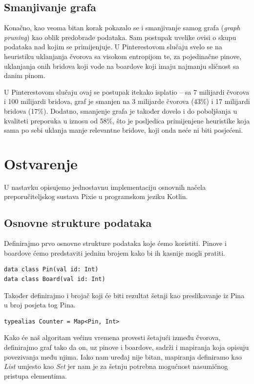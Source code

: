 \documentclass[times, utf8, seminar]{fer}
\begin{document}
\section{Smanjivanje grafa}

Konačno, kao veoma bitan korak pokazalo se i smanjivanje samog grafa (\textit{graph pruning}) kao oblik predobrade podataka. Sam postupak uvelike ovisi o skupu podataka nad kojim se primijenjuje. U Pinterestovom slučaju svelo se na heuristiku uklanjanja čvorova sa visokom entropijom te, za pojedinačne pinove, uklanjanja onih bridova koji vode na boardove koji imaju najmanju sličnost sa danim pinom.

U Pinterestovom slučaju ovaj se postupak itekako isplatio -- sa 7 milijardi čvorova i 100 milijardi bridova, graf je smanjen na 3 milijarde čvorova (43\%) i 17 milijardi bridova (17\%). Dodatno, smanjenje grafa je također dovelo i do poboljšanja u kvaliteti preporuka u iznosu od 58\%, što je posljedica primijenjene heuristike koja sama po sebi uklanja manje relevantne bridove, koji onda neće ni biti posjećeni.

\chapter{Ostvarenje}

U nastavku opisujemo jednostavnu implementaciju osnovnih načela preporučiteljskog sustava Pixie u programskom jeziku Kotlin.

\section{Osnovne strukture podataka}

Definirajmo prvo osnovne strukture podataka koje ćemo koristiti. Pinove i boardove ćemo predstaviti jednim brojem kako bi ih kasnije mogli pratiti.

\begin{lstlisting}
data class Pin(val id: Int)
data class Board(val id: Int)
\end{lstlisting}

Također definirajmo i brojač koji će biti rezultat šetnji kao preslikavanje iz Pina u broj posjeta tog Pina.

\begin{lstlisting}
typealias Counter = Map<Pin, Int>
\end{lstlisting}

Kako će naš algoritam većinu vremena provesti šetajući između čvorova, definirajmo graf tako da on, uz pinove i boardove, sadrži i mapiranja koja opisuju povezivanja među njima. Iako nam uređaj nije bitan, mapiranja definiramo kao \textit{List} umjesto kao \textit{Set} jer nam je za šetnju potrebna mogućnost nasumičnog pristupa elementima.
\end{document}
